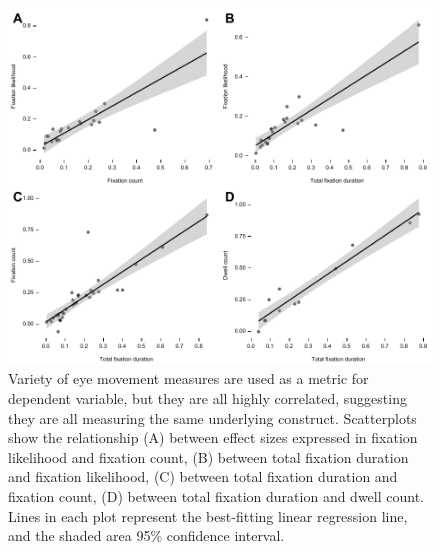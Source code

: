 \documentclass[english,natbib,man,floatsintext]{apa6}
\begin{document}
\begin{figure}%
\includegraphics{metric_correction}
\centering
\caption{Variety of eye movement measures are used as a metric for dependent variable, but they are all highly correlated, suggesting they are all measuring the same underlying construct. Scatterplots show the relationship (A) between effect sizes expressed in fixation likelihood and fixation count, (B) between total fixation duration and fixation likelihood, (C) between total fixation duration and fixation count, (D) between total fixation duration and dwell count. Lines in each plot represent the best-fitting linear regression line, and the shaded area 95\% confidence interval.}
\label{fig:metric_correction}
\end{figure}
\clearpage



\clearpage



\clearpage
\end{document}
